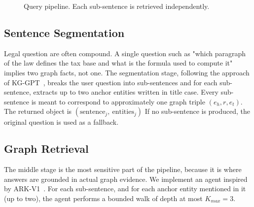 \documentclass[conference]{IEEEtran}
\begin{document}
\begin{figure}[h]
\centering
  \caption{Query pipeline. Each sub-sentence is retrieved independently.}
\label{fig:qeury}
\end{figure}

\subsection{Sentence Segmentation}
Legal question are often compound. A single question such as "which paragraph of the law defines the tax base and what is the formula used to compute it" implies two graph facts, not one. The segmentation stage, following the approach of KG-GPT~\cite{kggpt2023}, breaks the user question into sub-sentences and for each sub-sentence, extracts up to two anchor entities written in title case. Every sub-sentence is meant to correspond to approximately one graph triple $(e_h, r, e_t)$. The returned object is $(\text{sentence}_j,\ \text{entities}_j)$ If no sub-sentence is produced, the original question is used as a fallback.

\subsection{Graph Retrieval}
The middle stage is the most sensitive part of the pipeline, because it is where answers are grounded in actual graph evidence. We implement an agent inspired by {ARK-V1}~\cite{arkv12025}. For each sub-sentence, and for each anchor entity mentioned in it (up to two), the agent performs a bounded walk of depth at most $K_{max} = 3$.
\end{document}
